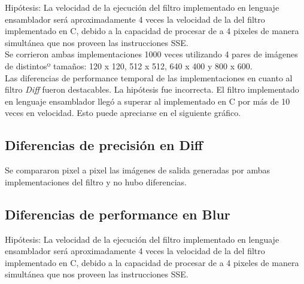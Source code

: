 \documentclass[10pt,a4paper,spanish]{article}
\begin{document}
Hipótesis: La velocidad de la ejecución del filtro implementado en lenguaje ensamblador será aproximadamente 4 veces la velocidad de la del filtro implementado en C, debido a la capacidad de procesar de a 4 pixeles de manera simultánea que nos proveen las instrucciones SSE. \\

Se corrieron ambas implementaciones 1000 veces utilizando 4 pares de imágenes de distintosº tamaños: 120 x 120, 512 x 512, 640 x 400 y 800 x 600. \\

Las diferencias de performance temporal de las implementaciones en cuanto al filtro \textit{Diff} fueron destacables. La hipótesis fue incorrecta. El filtro implementado en lenguaje ensamblador llegó a superar al implementado en C por más de 10 veces en velocidad. Esto puede apreciarse en el siguiente gráfico. \\


\subsection{Diferencias de precisión en Diff}

Se compararon pixel a pixel las imágenes de salida generadas por ambas implementaciones del filtro y no hubo diferencias.

\subsection{Diferencias de performance en Blur}

Hipótesis: La velocidad de la ejecución del filtro implementado en lenguaje ensamblador será aproximadamente 4 veces la velocidad de la del filtro implementado en C, debido a la capacidad de procesar de a 4 pixeles de manera simultánea que nos proveen las instrucciones SSE. \\
\end{document}
